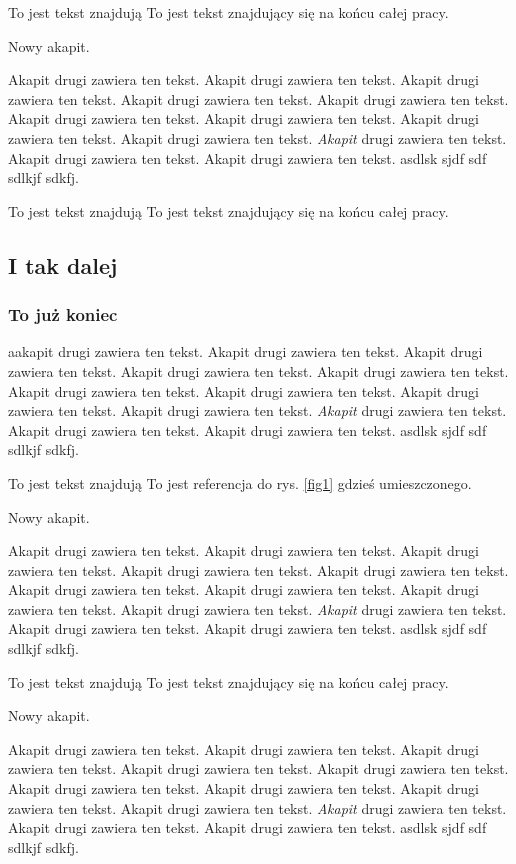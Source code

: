 To jest tekst znajdują
To jest tekst znajdujący się na końcu całej pracy.

Nowy akapit.

Akapit drugi zawiera ten tekst. Akapit drugi zawiera ten tekst. Akapit drugi zawiera ten tekst.
Akapit drugi zawiera ten tekst. Akapit drugi zawiera ten tekst. Akapit drugi zawiera ten tekst.
Akapit drugi zawiera ten tekst. Akapit drugi zawiera ten tekst. Akapit drugi zawiera ten tekst.
\emph{Akapit} drugi zawiera ten tekst. Akapit drugi zawiera ten tekst. Akapit drugi zawiera ten tekst.
asdlsk sjdf sdf sdlkjf sdkfj.


To jest tekst znajdują
To jest tekst znajdujący się na końcu całej pracy.

\subsection{I tak dalej}
\subsubsection{To już koniec}

aakapit drugi zawiera ten tekst. Akapit drugi zawiera ten tekst. Akapit drugi zawiera ten tekst.
Akapit drugi zawiera ten tekst. Akapit drugi zawiera ten tekst. Akapit drugi zawiera ten tekst.
Akapit drugi zawiera ten tekst. Akapit drugi zawiera ten tekst. Akapit drugi zawiera ten tekst.
\emph{Akapit} drugi zawiera ten tekst. Akapit drugi zawiera ten tekst. Akapit drugi zawiera ten tekst.
asdlsk sjdf sdf sdlkjf sdkfj.


To jest tekst znajdują
To jest referencja do rys. \ref{fig1} gdzieś umieszczonego.

Nowy akapit.

Akapit drugi zawiera ten tekst. Akapit drugi zawiera ten tekst. Akapit drugi zawiera ten tekst.
Akapit drugi zawiera ten tekst. Akapit drugi zawiera ten tekst. Akapit drugi zawiera ten tekst.
Akapit drugi zawiera ten tekst. Akapit drugi zawiera ten tekst. Akapit drugi zawiera ten tekst.
\emph{Akapit} drugi zawiera ten tekst. Akapit drugi zawiera ten tekst. Akapit drugi zawiera ten tekst.
asdlsk sjdf sdf sdlkjf sdkfj.


To jest tekst znajdują
To jest tekst znajdujący się na końcu całej pracy.

Nowy akapit.

Akapit drugi zawiera ten tekst. Akapit drugi zawiera ten tekst. Akapit drugi zawiera ten tekst.
Akapit drugi zawiera ten tekst. Akapit drugi zawiera ten tekst. Akapit drugi zawiera ten tekst.
Akapit drugi zawiera ten tekst. Akapit drugi zawiera ten tekst. Akapit drugi zawiera ten tekst.
\emph{Akapit} drugi zawiera ten tekst. Akapit drugi zawiera ten tekst. Akapit drugi zawiera ten tekst.
asdlsk sjdf sdf sdlkjf sdkfj.

